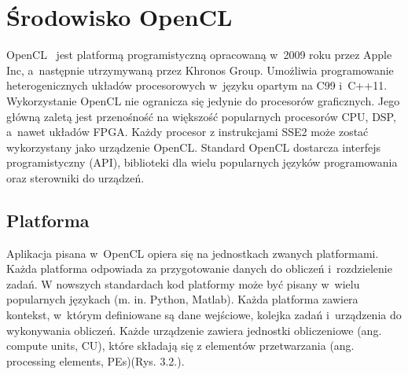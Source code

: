 
\section{Środowisko OpenCL}\label{sec:OpenCL}

OpenCL~\cite{b21} jest platformą programistyczną opracowaną w~2009 roku przez Apple Inc, a~następnie utrzymywaną przez Khronos Group. Umożliwia programowanie heterogenicznych układów procesorowych w~języku opartym na C99 i~C++11. Wykorzystanie OpenCL nie ogranicza się jedynie do procesorów graficznych. Jego główną zaletą jest przenośność na większość popularnych procesorów CPU, DSP, a~nawet układów FPGA. Każdy procesor z instrukcjami SSE2 może zostać wykorzystany jako urządzenie OpenCL. Standard OpenCL dostarcza interfejs programistyczny (API), biblioteki dla wielu popularnych języków programowania oraz sterowniki do urządzeń.

\subsection{Platforma}\label{sec:platforma}

Aplikacja pisana w~OpenCL opiera się na jednostkach zwanych platformami. Każda platforma odpowiada za przygotowanie danych do obliczeń i~rozdzielenie zadań. W nowszych standardach kod platformy może być pisany w~wielu popularnych językach  (m. in. Python, Matlab). Każda platforma zawiera kontekst, w~którym definiowane są dane wejściowe, kolejka zadań i~urządzenia do wykonywania obliczeń. Każde urządzenie zawiera jednostki obliczeniowe (ang. compute units, CU), które składają się z elementów przetwarzania (ang. processing elements, PEs)(Rys. 3.2.). 

